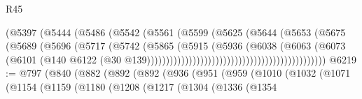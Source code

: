\begin{lexlean}{R45}
\begin{coremodule}
{                                                    (@5397
                                                      (@5444
                                                        (@5486
                                                          (@5542
                                                            (@5561
                                                              (@5599
                                                                (@5625
                                                                  (@5644
                                                                    (@5653
                                                                      (@5675
                                                                        (@5689
                                                                          (@5696
                                                                            (@5717
                                                                              (@5742
                                                                                (@5865
                                                                                  (@5915
                                                                                    (@5936
                                                                                      (@6038
                                                                                        (@6063
                                                                                          (@6073
                                                                                            (@6101
                                                                                              (@140
                                                                                                @6122
                                                                                                (@30
                                                                                                  @139)))))))))))))))))))))))))))))))))))))))))))))))
@6219 := @797
    (@840
      (@882
        (@892
          (@892
            (@936
              (@951
                (@959
                  (@1010
                    (@1032
                      (@1071
                        (@1154
                          (@1159
                            (@1180
                              (@1208
                                (@1217
                                  (@1304
                                    (@1336
                                      (@1354
}
\end{coremodule}
\end{lexlean}
